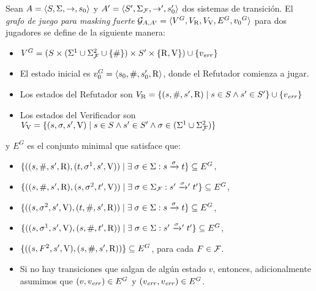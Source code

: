 \begin{definition} \label{def:strong_masking_game_graph}
  Sean $A=\langle S, \Sigma, \rightarrow, s_0 \rangle$ y $A'=\langle S',
  \Sigma_{\mathcal{F}}, \rightarrow', s'_0 \rangle$ dos sistemas de transición.
  El \emph{grafo de juego para masking fuerte} 
  $\mathcal{G}_{A, A'} = \langle V^G, V_{\mathrm{R}}, V_{\mathrm{V}}, E^G, {v_0}^G \rangle$ 
  para dos jugadores se define de la siguiente manera:

\begin{itemize}
  \item $V^G = (S \times ( \Sigma^1 \cup \Sigma_{\mathcal{F}}^2 \cup\{\#\}) \times S' \times \{ \mathrm{R}, \mathrm{V} \}) 
  \cup \{v_{\mathit{err}}\}$
  \item El estado inicial es $v_0^G = \langle s_0, \#, s'_0, \mathrm{R} \rangle$, donde el Refutador comienza a jugar.
  \item Los estados del Refutador son $V_{\mathrm{R}} = \{ (s, \#, s', \mathrm{R}) \mid s \in S \wedge s' \in S' \} 
  \cup \{v_{\mathit{err}}\}$
  \item Los estados del Verificador son $V_{\mathrm{V}} = \{ (s, \sigma, s', \mathrm{V}) \mid s \in S \wedge s' \in S' \wedge \sigma \in ( \Sigma^1 \cup \Sigma_{\mathcal{F}}^2 )\}$
\end{itemize}
y $E^G$ es el conjunto minimal que satisface que:
\begin{itemize}
  \item $\{ ( (s, \#, s', \mathrm{R}) , (t, \sigma^{1}, s', \mathrm{V})) \mid \exists\;\sigma \in \Sigma: s \xrightarrow{\sigma} t \} \subseteq E^G$,

  \item $\{ ((s, \#, s', \mathrm{R}), (s, \sigma^{2}, t', \mathrm{V}))  \mid \exists\;\sigma \in \Sigma_{\mathcal{F}}: s' \mathrel{{\xrightarrow[]{\sigma}}{}'} t' \} \subseteq E^G$,

  \item $\{ ((s, \sigma^2, s', \mathrm{V}), (t, \#, s', \mathrm{R})) \mid \exists\;\sigma \in \Sigma: s \xrightarrow{\sigma} t \} \subseteq E^G$,

  \item $\{ ((s, \sigma^1, s', \mathrm{V}), (s, \#, t', \mathrm{R})) \mid \exists\;\sigma \in \Sigma: s' \mathrel{{\xrightarrow[]{\sigma}}{}'} t' \} \subseteq E^G$,

  \item $\{ ((s, F^2, s', \mathrm{V}), (s, \#, s', \mathrm{R})) \} \subseteq E^G$, para cada $F \in \mathcal{F}$. 

  \item Si no hay transiciones que salgan de algún estado $v$, entonces, adicionalmente asumimos que $(v, v_{\mathit{err}}) \in E^G$ y $(v_{\mathit{err}}, v_{\mathit{err}}) \in E^G$.
\end{itemize}

\end{definition}

